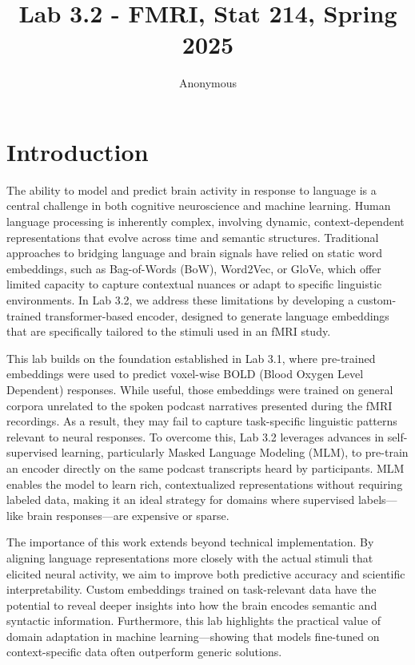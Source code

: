 \documentclass[11pt,letterpaper]{article}
\title{Lab 3.2 - FMRI, Stat 214, Spring 2025\vspace{-1em}}
\author{Anonymous}
\begin{document}
\maketitle

\vspace{1em} %
\section{Introduction}
\vspace{0.5em} %

The ability to model and predict brain activity in response to language is a central challenge in both cognitive neuroscience and machine learning. Human language processing is inherently complex, involving dynamic, context-dependent representations that evolve across time and semantic structures. Traditional approaches to bridging language and brain signals have relied on static word embeddings, such as Bag-of-Words (BoW), Word2Vec, or GloVe, which offer limited capacity to capture contextual nuances or adapt to specific linguistic environments. In Lab 3.2, we address these limitations by developing a custom-trained transformer-based encoder, designed to generate language embeddings that are specifically tailored to the stimuli used in an fMRI study.

This lab builds on the foundation established in Lab 3.1, where pre-trained embeddings were used to predict voxel-wise BOLD (Blood Oxygen Level Dependent) responses. While useful, those embeddings were trained on general corpora unrelated to the spoken podcast narratives presented during the fMRI recordings. As a result, they may fail to capture task-specific linguistic patterns relevant to neural responses. To overcome this, Lab 3.2 leverages advances in self-supervised learning, particularly Masked Language Modeling (MLM), to pre-train an encoder directly on the same podcast transcripts heard by participants. MLM enables the model to learn rich, contextualized representations without requiring labeled data, making it an ideal strategy for domains where supervised labels—like brain responses—are expensive or sparse.

The importance of this work extends beyond technical implementation. By aligning language representations more closely with the actual stimuli that elicited neural activity, we aim to improve both predictive accuracy and scientific interpretability. Custom embeddings trained on task-relevant data have the potential to reveal deeper insights into how the brain encodes semantic and syntactic information. Furthermore, this lab highlights the practical value of domain adaptation in machine learning—showing that models fine-tuned on context-specific data often outperform generic solutions.
\end{document}
